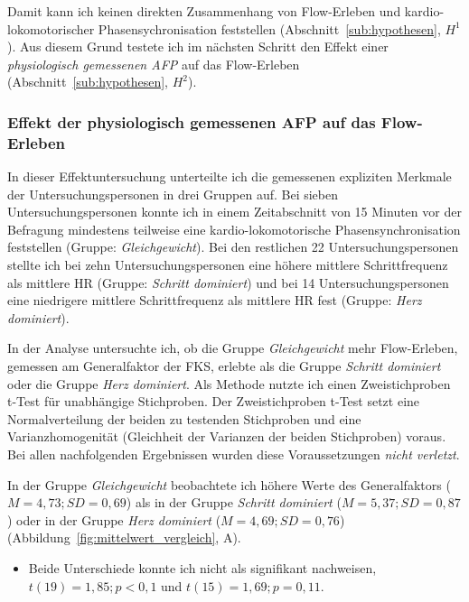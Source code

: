 Damit kann ich keinen direkten Zusammenhang von Flow-Erleben und kardio-lokomotorischer Phasensychronisation feststellen (Abschnitt~\ref{sub:hypothesen}, $H^1$). Aus diesem Grund testete ich im nächsten Schritt den Effekt einer \emph{physiologisch gemessenen \ac{AFP}} auf das Flow-Erleben (Abschnitt~\ref{sub:hypothesen}, $H^2$).

\subsubsection{Effekt der physiologisch gemessenen \ac{AFP} auf das Flow-Erleben} 

\label{ssub:effekt_der_physiologisch_gemessenen_afp}

In dieser Effektuntersuchung unterteilte ich die gemessenen expliziten Merkmale der Untersuchungspersonen in drei Gruppen auf. Bei sieben Untersuchungspersonen konnte ich in einem Zeitabschnitt von 15 Minuten vor der Befragung mindestens teilweise eine kardio-lokomotorische Phasensynchronisation feststellen (Gruppe: \emph{Gleichgewicht}). Bei den restlichen 22 Untersuchungspersonen stellte ich bei zehn Untersuchungspersonen eine höhere mittlere Schrittfrequenz als mittlere \ac{HR} (Gruppe: \emph{Schritt dominiert}) und bei 14 Untersuchungspersonen eine niedrigere mittlere Schrittfrequenz als mittlere \ac{HR} fest (Gruppe: \emph{Herz dominiert}).

In der Analyse untersuchte ich, ob die Gruppe \emph{Gleichgewicht} mehr Flow-Erleben, gemessen am Generalfaktor der \ac{FKS}, erlebte als die Gruppe \emph{Schritt dominiert} oder die Gruppe \emph{Herz dominiert}. Als Methode nutzte ich einen Zweistichproben t-Test für unabhängige Stichproben. Der Zweistichproben t-Test setzt eine Normalverteilung der beiden zu testenden Stichproben und eine Varianzhomogenität (Gleichheit der Varianzen der beiden Stichproben) voraus. Bei allen nachfolgenden Ergebnissen wurden diese Voraussetzungen \emph{nicht verletzt}. 

In der Gruppe \emph{Gleichgewicht} beobachtete ich höhere Werte des Generalfaktors ($M = 4{,}73; SD = 0{,}69$) als in der Gruppe \emph{Schritt dominiert} ($M = 5{,}37; SD = 0{,}87$) oder in der Gruppe \emph{Herz dominiert} ($M = 4{,}69; SD = 0{,}76$) (Abbildung~\ref{fig:mittelwert_vergleich}, A). 
\begin{itemize}
	
	\item Beide Unterschiede konnte ich nicht als signifikant nachweisen, $t(19) = 1{,}85; p < 0{,}1$ und $t(15) = 1{,}69; p = 0{,}11$.
\end{itemize}

